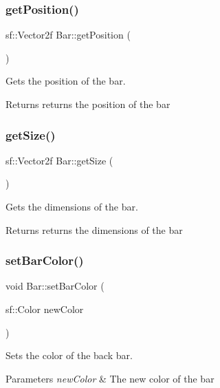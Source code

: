 \subsubsection{\texorpdfstring{get\+Position()}{getPosition()}}
{\footnotesize\ttfamily sf\+::\+Vector2f Bar\+::get\+Position (\begin{DoxyParamCaption}{ }\end{DoxyParamCaption})}



Gets the position of the bar. 

\begin{DoxyReturn}{Returns}
returns the position of the bar 
\end{DoxyReturn}
\mbox{\label{class_bar_a1d0a9f5d5951e0f5809aac6d723dfeae}} 
\subsubsection{\texorpdfstring{get\+Size()}{getSize()}}
{\footnotesize\ttfamily sf\+::\+Vector2f Bar\+::get\+Size (\begin{DoxyParamCaption}{ }\end{DoxyParamCaption})}



Gets the dimensions of the bar. 

\begin{DoxyReturn}{Returns}
returns the dimensions of the bar 
\end{DoxyReturn}
\mbox{\label{class_bar_a0d343012bc0213facc0b76babae2fe61}} 
\subsubsection{\texorpdfstring{set\+Bar\+Color()}{setBarColor()}}
{\footnotesize\ttfamily void Bar\+::set\+Bar\+Color (\begin{DoxyParamCaption}\item[{sf\+::\+Color}]{new\+Color }\end{DoxyParamCaption})}



Sets the color of the back bar. 


\begin{DoxyParams}{Parameters}
{\em new\+Color} & The new color of the bar \\
\hline
\end{DoxyParams}
\mbox{\label{class_bar_aa2ad1466fc95788485da4168f1a72ea8}} 

